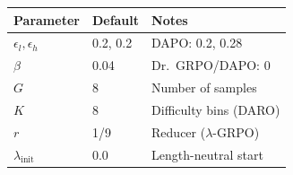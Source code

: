 \documentclass[11pt,a4paper]{article}
\begin{document}
\begin{center}
\begin{tabular}{@{}lll@{}}
\toprule
\textbf{Parameter} & \textbf{Default} & \textbf{Notes} \\
\midrule
$\epsilon_l, \epsilon_h$ & 0.2, 0.2 & DAPO: 0.2, 0.28 \\
$\beta$ & 0.04 & Dr.~GRPO/DAPO: 0 \\
$G$ & 8 & Number of samples \\
$K$ & 8 & Difficulty bins (DARO) \\
$r$ & 1/9 & Reducer ($\lambda$-GRPO) \\
$\lambda_{\text{init}}$ & 0.0 & Length-neutral start \\
\bottomrule
\end{tabular}
\end{center}
\end{document}
